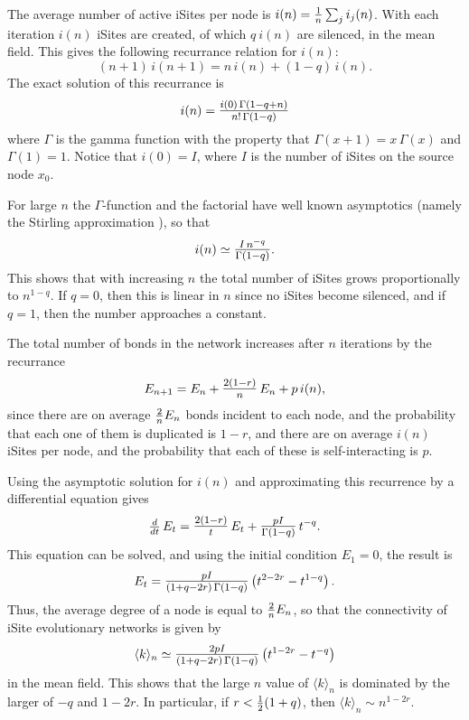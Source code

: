 \documentclass[12pt]{iopart}
\def\sfrac#1#2{\hbox{\normalsize $\frac{#1}{#2}$}}
\def\Sfrac#1#2{\hbox{\large$\frac{#1}{#2}$}}
\def\thin{\:\!}
\begin{document}
The average number of active iSites per node is $i(n) = \sfrac{1}{n} \sum_j i_j(n)$.  With each iteration
$i(n)$ iSites are created, of which $q\thin i(n)$ are silenced, in the mean field.  This gives the following
recurrance relation for $i(n)$:
\begin{equation}
(n+1)\,i(n+1) = n\, i(n) + (1-q)\,i(n) .
\label{eqn44x}   %
\end{equation}
The exact solution of this recurrance is
\begin{equation}
i(n) = \Sfrac{i(0)\, \Gamma(1-q+n)}{n!\,\Gamma(1-q)}
\label{eqn45}   %
\end{equation}
where $\Gamma$ is the gamma function with the property that $\Gamma(x+1)=x\,\Gamma(x)$ and
$\Gamma(1)=1$.   Notice that $i(0) = I$, where $I$ is the number of iSites on the source node
$x_0$.

For large $n$ the $\Gamma$-function and the factorial have well known asymptotics
(namely the Stirling approximation \cite{W61}), so that
\begin{equation}
i(n) \simeq \Sfrac{I\,n^{-q}}{\Gamma(1-q)} .
\label{eqn46}   %
\end{equation}
This shows that with increasing $n$ the total number of iSites grows proportionally to $n^{1-q}$.
If $q=0$, then this is linear in $n$ since no iSites become silenced, and if $q=1$, then the 
number approaches a constant.

The total number of bonds in the network increases after $n$ iterations by the recurrance
\begin{equation}
E_{n+1} = E_n + \Sfrac{2(1-r)}{n}\,E_n + p\, i(n) ,
\label{eqn47}   %
\end{equation}
since there are on average $\sfrac{2}{n} E_n$ bonds incident to each node, and the probability
that each one of them is duplicated is $1-r$, and there are on average $i(n)$ iSites
per node, and the probability that each of these is self-interacting is $p$.

Using the asymptotic solution for $i(n)$ and approximating this recurrence by a 
differential equation gives
\begin{equation}
\sfrac{d}{dt}\,E_t = \Sfrac{2(1-r)}{t}\,E_t + \Sfrac{pI}{\Gamma(1-q)}\,t^{-q} .
\end{equation}
This equation can be solved, and using the initial condition $E_1=0$, the result is
\begin{equation}
E_t = \Sfrac{pI}{(1+q-2r)\,\Gamma(1-q)} \left( t^{2-2r} - t^{1-q} \right).
\label{eqn49}   %
\end{equation}
Thus, the average degree of a node is equal to $\sfrac{2}{n} E_n$, so that the
connectivity of iSite evolutionary networks is given by
\begin{equation}
\langle k\rangle_n \simeq \Sfrac{2pI}{(1+q-2r)\,\Gamma(1-q)} \left( t^{1-2r} - t^{-q} \right) 
\label{eqn50}   %
\end{equation}
in the mean field. This shows that the large $n$ value of $\langle k \rangle_n$ 
is dominated by the larger of $-q$ and $1-2r$.  In particular, if $r < \sfrac{1}{2}(1+q)$, 
then $\langle k \rangle_n \sim n^{1-2r}$.
\end{document}
